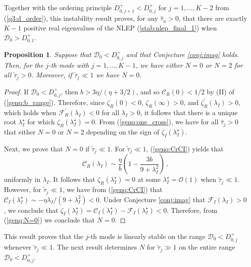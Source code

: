 \documentclass{article}%
\newtheorem{prop}[theorem]{Proposition}
\newcommand{\dzjp}{D^{+}_{0,j}}
\begin{document}
Together with the ordering principle $D^{+}_{0,j+1}<D^{+}_{0,j}$ for
$j=1,\ldots, K-2$ from (\ref{q3:d_order}), this instability result
proves, for any $\hat{\tau}_u>0$, that there are exactly $K-1$
positive real eigenvalues of the NLEP (\ref{stab:nlep_final_1}) when
${\mathcal D}_0>D^{+}_{0,1}$.

\begin{prop}\label{prop:genq:N=02} Suppose that ${\mathcal D}_0<\dzjp$ and 
that Conjecture \ref{conj:imag} holds. Then, for the $j$-th mode with
$j=1,\ldots,K-1$, we have either $N=0$ or $N=2$ for all $\tilde{\tau}_j>0$.
Moreover, if $\tilde{\tau}_j\ll 1$ we have $N=0$.
\end{prop}

\begin{proof}
If ${\mathcal D}_0<\dzjp$, then $b>{3\eta/(\eta+{3/2})}$, and so
${\mathcal C}_R(0)<{1/2}$ by (II) of (\ref{genq:b_range}). Therefore,
since $\zeta_{R}(0)<0$, $\zeta_R(\infty)>0$, and
$\zeta_R^{\prime}(\lambda_I)>0$, which holds when ${\mathcal
  F}_R^{\prime}(\lambda_I)<0$ for all $\lambda_I>0$, it follows that
there is a unique root $\lambda_I^{\star}$ for which
$\zeta_R(\lambda^{\star}_I)=0$. From (\ref{genq:one_cross}), we have
for all $\hat{\tau}_j>0$ that either $N=0$ or $N=2$ depending on the sign of
$\zeta_I(\lambda_I^{\star})$. 

Next, we prove that $N=0$ if $\tilde{\tau}_j\ll 1$. For
$\tilde{\tau}_j\ll 1$, (\ref{genq:CrCI}) yields that
\begin{equation*}
    {\mathcal C}_R(\lambda_I) \sim \frac{\eta}{b}\left( 1 - 
 \frac{3b}{9+\lambda_I^2} \right) \,,
\end{equation*}
uniformly in $\lambda_I$. It follows that
$\zeta_R(\lambda_I^{\star})=0$ at some $\lambda_I^{\star}={\mathcal
  O}(1)$ when $\tilde{\tau}_j\ll 1$.  However, for $\tilde{\tau}_j\ll
1$, we have from (\ref{genq:CrCI}) that ${\mathcal
  C}_I(\lambda_I^{\star})\sim -{\eta
  \lambda_I/\left(9+\lambda_I^2\right)}<0$.  Under Conjecture
\ref{conj:imag} that ${\mathcal F}_I(\lambda_I)>0$, we conclude that
$\zeta_I(\lambda_I^{\star})={\mathcal C}_{I}(\lambda_I^{\star})-
    {\mathcal F}_{I}(\lambda_{I}^{\star})<0$. Therefore, from
    (\ref{genq:N=0}) we conclude that $N=0$.
\end{proof}

This result proves that the $j$-th mode is linearly stable on the
range ${\mathcal D}_0<\dzjp$ whenever $\tilde{\tau}_j\ll 1$. The next
result determines $N$ for $\tilde{\tau}_j\gg 1$ on the entire range
${\mathcal D}_0<\dzjp$.
\end{document}
